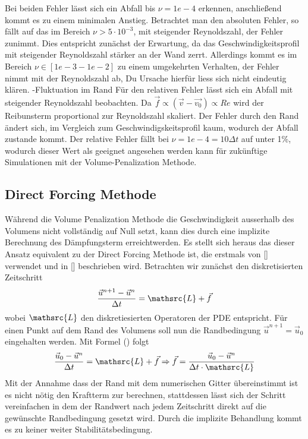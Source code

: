 Bei beiden Fehler lässt sich ein Abfall bis $\nu=1e-4$ erkennen, anschließend kommt es zu einem minimalen Anstieg.
Betrachtet man den absoluten Fehler, so fällt auf das im Bereich $\nu>5\cdot10^{-3}$, mit steigender Reynoldszahl, der Fehler zunimmt.
Dies entspricht zunächst der Erwartung, da das Geschwindigkeitsprofil mit steigender Reynoldszahl stärker an der Wand zerrt.
Allerdings kommt es im Bereich $\nu \in [1e-3 - 1e-2]$ zu einem umgekehrten Verhalten, der Fehler nimmt mit der Reynoldszahl ab,
Du Ursache hierfür liess sich nicht eindeutig klären.
-Fluktuation  im Rand
Für den relativen Fehler lässt sich ein Abfall mit steigender Reynoldszahl beobachten. Da $\vec{f} \propto (\vec{v}-\vec{v_0})  \propto Re$ wird der Reibunsterm
proportional zur Reynoldszahl skaliert. Der Fehler durch den Rand ändert sich, im Vergleich zum Geschwindigskeitsprofil kaum, wodurch der Abfall zustande kommt.
Der relative Fehler fällt bei $\nu=1e-4=10\Delta t$ auf unter 1\%, wodurch dieser Wert als geeignet angesehen werden kann für zukünftige Simulationen mit der Volume-Penalization Methode.

\subsection{Direct Forcing Methode}
Während die Volume Penalization Methode die Geschwindigkeit ausserhalb des Volumens nicht vollständig auf Null setzt,
 kann dies durch eine implizite Berechnung des Dämpfungsterm erreichtwerden. Es stellt sich heraus das dieser Ansatz equivalent
  zu der Direct Forcing Methode ist, die erstmals von [] verwendet und in [] beschrieben wird.
Betrachten wir zunächst den diskretisierten Zeitschritt
\begin{align}
    \frac{\vec{u}^{n+1} -\vec{u}^n}{\Delta t} = \mathsrc{L} + \vec{f}\\
\end{align}
wobei $\mathsrc{L}$ den diskretiesierten Operatoren der PDE entspricht.
Für einen Punkt auf dem Rand des Volumens soll nun die Randbedingung $\vec{u}^{n+1} = \vec{u}_0$ eingehalten werden.
Mit Formel () folgt
\begin{align}
    \frac{\vec{u}_0 -\vec{u}^n}{\Delta t} = \mathsrc{L} + \vec{f} \Rightarrow \vec{f} = \frac{\vec{u}_0 -\vec{u}^n}{\Delta t\cdot \mathsrc{L}}\\
\end{align}
Mit der Annahme dass der Rand mit dem numerischen Gitter übereinstimmt ist es nicht nötig den Kraftterm zur berechnen, stattdessen lässt sich der Schritt vereinfachen in dem der Randwert nach  jedem Zeitschritt direkt auf die gewünschte Randbedingung gesetzt wird. Durch die implizite Behandlung kommt es zu keiner weiter Stabilitätsbedingung.

